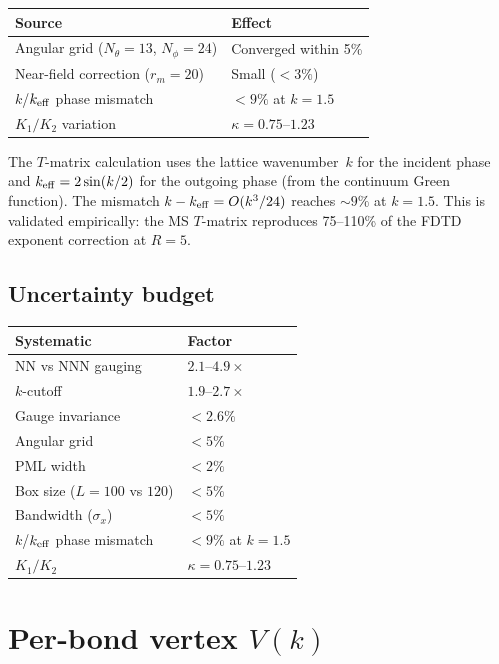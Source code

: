 \documentclass[11pt]{article}
\begin{document}
\begin{table}[h]
\begin{tabular}{ll}
\hline
Source & Effect \\
\hline
Angular grid ($N_\theta = 13$, $N_\phi = 24$) & Converged within 5\% \\
Near-field correction ($r_m = 20$) & Small ($< 3\%$) \\
$k$/$k_{\rm eff}$ phase mismatch & $< 9\%$ at $k = 1.5$ \\
$K_1/K_2$ variation & $\kappa = 0.75$--$1.23$ \\
\hline
\end{tabular}
\end{table}

The $T$-matrix calculation uses the lattice wavenumber~$k$ for the incident
phase and $k_{\rm eff} = 2\sin(k/2)$ for the outgoing phase (from the
continuum Green function). The mismatch $k - k_{\rm eff} = O(k^3/24)$
reaches $\sim 9\%$ at $k = 1.5$. This is validated empirically: the MS
$T$-matrix reproduces 75--110\% of the FDTD exponent correction at $R = 5$.

\subsection{Uncertainty budget}

\begin{table}[h]
\begin{tabular}{ll}
\hline
Systematic & Factor \\
\hline
NN vs NNN gauging & $2.1$--$4.9\times$ \\
$k$-cutoff & $1.9$--$2.7\times$ \\
Gauge invariance & $< 2.6\%$ \\
Angular grid & $< 5\%$ \\
PML width & $< 2\%$ \\
Box size ($L = 100$ vs $120$) & $< 5\%$ \\
Bandwidth ($\sigma_x$) & $< 5\%$ \\
$k$/$k_{\rm eff}$ phase mismatch & $< 9\%$ at $k = 1.5$ \\
$K_1/K_2$ & $\kappa = 0.75$--$1.23$ \\
\hline
\end{tabular}
\end{table}

\section{Per-bond vertex \texorpdfstring{$V(k)$}{V(k)}}
\label{sec:vertex}
\end{document}
